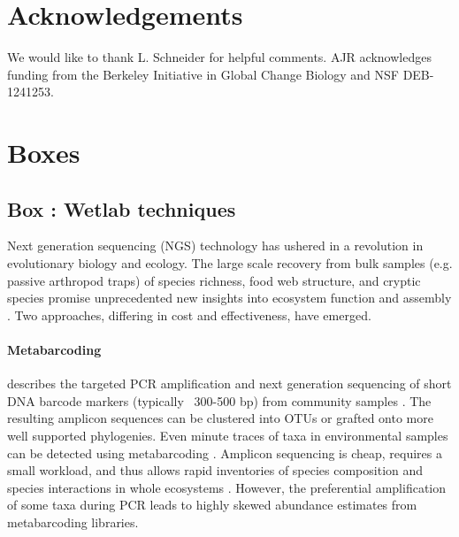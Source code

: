 \documentclass[12pt]{article}
\newcounter{Box}
\begin{document}
\section*{Acknowledgements}

We would like to thank L. Schneider for helpful comments. AJR
acknowledges funding from the Berkeley Initiative in Global Change
Biology and NSF DEB-1241253.

\pagebreak




\pagebreak

\section*{Boxes}


\label{box:wet}
\subsection*{Box \theBox: Wetlab techniques}

Next generation sequencing (NGS) technology has ushered in a revolution in
evolutionary biology and ecology. The large scale recovery from bulk
samples (e.g. passive arthropod traps) of species richness, food web
structure, and cryptic species promise unprecedented new insights into
ecosystem function and assembly \citep{krehenwinkel2016,
  shokralla2015, gibson2014, taberlet2012}.  Two approaches, differing
in cost and effectiveness, have emerged.

\paragraph{Metabarcoding} describes the targeted PCR amplification and
next generation sequencing of short DNA barcode markers (typically
~300-500 bp) from community samples \citep{ji2013}. The resulting
amplicon sequences can be clustered into OTUs or grafted onto more
well supported phylogenies. Even minute traces of taxa in
environmental samples can be detected using metabarcoding
\citep{bohmann2014}.  Amplicon sequencing is cheap, requires a small
workload, and thus allows rapid inventories of species composition and
species interactions in whole ecosystems \citep{gibson2014,
  leray2015}. However, the preferential amplification of some taxa
during PCR leads to highly skewed abundance estimates
\citep{elbrecht2015} from metabarcoding libraries.
\end{document}
